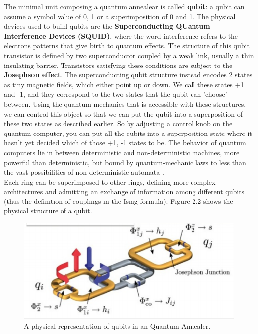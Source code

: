  The minimal unit composing a quantum annealear is called \textbf{qubit}: a qubit can assume a symbol value of 0, 1 or a superimposition of 0 and 1. The physical devices used to build qubits are the \textbf{Superconducting QUantum Interference Devices (SQUID)}, where the word interference refers to the electrons patterns that give birth to quantum effects. The structure of this qubit transistor is defined by two superconductor coupled by a weak link, usually a thin insulating barrier. Transistors satisfying these conditions are subject to the \textbf{Josephson effect}. The superconducting qubit structure instead encodes 2 states as tiny magnetic fields, which either point up or down. We call these states +1 and -1, and they correspond to the two states that the qubit can 'choose' between. Using the quantum mechanics that is accessible with these structures, we can control this object so that we can put the qubit into a superposition of these two states as described earlier. So by adjusting a control knob on the quantum computer, you can put all the qubits into a superposition state where it hasn't yet decided which of those +1, -1 states to be. The behavior of quantum computers lie in between deterministic
and non-deterministic machines, more powerful than deterministic, but bound by quantum-mechanic laws to less than the vast possibilities of non-deterministic automata \cite{pa11}.\\
  Each ring can be superimposed to other rings, defining more complex architectures and admitting an exchange of information among different qubits (thus the definition of couplings in the Ising formula). Figure 2.2 shows the physical structure of a qubit.\\
  
  \begin{figure}[t]
	\begin{center}
	\includegraphics{images/QA.PNG}
	\caption{A physical representation of qubits in an Quantum Annealer.}
	\end{center}
\end{figure}

